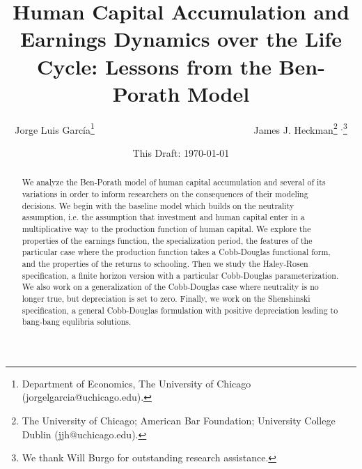 


\title{Human Capital Accumulation and Earnings Dynamics over the Life Cycle: Lessons from the Ben-Porath Model}
\author{Jorge Luis Garc\'{i}a\thanks{Department of Economics, The University of Chicago (jorgelgarcia@uchicago.edu).} \ \ \ \ \ \ \ \ \ \ \ \ \ \ \ \ \ \ \ \ \ \ \
 \ \ \ \ \ \ \ \ \ James J. Heckman\thanks{The University of Chicago; American Bar Foundation; University College Dublin (jjh@uchicago.edu).} $^{,}$\thanks{We thank  Will Burgo for outstanding research assistance.}}
\date{This Draft: \today}
\maketitle


\begin{abstract}
\noindent We analyze the Ben-Porath model of human capital accumulation and several of its variations in order to inform researchers on the consequences of their modeling decisions. We begin with the baseline model which builds on the neutrality assumption, i.e. the assumption that investment and human capital enter in a multiplicative way to the production function of human capital. We explore the properties of the earnings function, the specialization period, the features of the particular case where the production function takes a Cobb-Douglas functional form, and the properties of the returns to schooling. Then we study the Haley-Rosen specification, a finite horizon version with a particular Cobb-Douglas parameterization. We also work on a generalization of the Cobb-Douglas case where neutrality is no longer true, but depreciation is set to zero. Finally, we work on the Shenshinski specification, a general Cobb-Douglas formulation with positive depreciation leading to bang-bang equlibria solutions.
\end{abstract}



 

\clearpage





